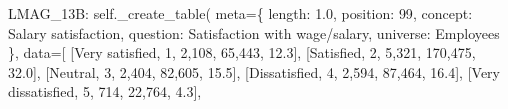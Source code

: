\documentclass[
  11pt,
  a4paper,
]{article}
\newenvironment{Shaded}{\begin{snugshade}}{\end{snugshade}}
\newcommand{\NormalTok}[1]{\textcolor[rgb]{0.00,0.23,0.31}{#1}}
\newcommand{\OperatorTok}[1]{\textcolor[rgb]{0.37,0.37,0.37}{#1}}
\newcommand{\StringTok}[1]{\textcolor[rgb]{0.13,0.47,0.30}{#1}}
\newcommand{\VariableTok}[1]{\textcolor[rgb]{0.07,0.07,0.07}{#1}}
\begin{document}
\begin{Shaded}
\begin{Highlighting}[]
    \StringTok{\textquotesingle{}LMAG\_13B\textquotesingle{}}\NormalTok{: }\VariableTok{self}\NormalTok{.\_create\_table(}
\NormalTok{        meta}\OperatorTok{=}\NormalTok{\{}
            \StringTok{\textquotesingle{}length\textquotesingle{}}\NormalTok{: }\StringTok{\textquotesingle{}1.0\textquotesingle{}}\NormalTok{, }\StringTok{\textquotesingle{}position\textquotesingle{}}\NormalTok{: }\StringTok{\textquotesingle{}99\textquotesingle{}}\NormalTok{,}
            \StringTok{\textquotesingle{}concept\textquotesingle{}}\NormalTok{: }\StringTok{\textquotesingle{}Salary satisfaction\textquotesingle{}}\NormalTok{,}
            \StringTok{\textquotesingle{}question\textquotesingle{}}\NormalTok{: }\StringTok{\textquotesingle{}Satisfaction with wage/salary\textquotesingle{}}\NormalTok{,}
            \StringTok{\textquotesingle{}universe\textquotesingle{}}\NormalTok{: }\StringTok{\textquotesingle{}Employees\textquotesingle{}}
\NormalTok{        \},}
\NormalTok{        data}\OperatorTok{=}\NormalTok{[}
\NormalTok{            [}\StringTok{\textquotesingle{}Very satisfied\textquotesingle{}}\NormalTok{, }\StringTok{\textquotesingle{}1\textquotesingle{}}\NormalTok{, }\StringTok{\textquotesingle{}2,108\textquotesingle{}}\NormalTok{, }\StringTok{\textquotesingle{}65,443\textquotesingle{}}\NormalTok{, }\StringTok{\textquotesingle{}12.3\textquotesingle{}}\NormalTok{],}
\NormalTok{            [}\StringTok{\textquotesingle{}Satisfied\textquotesingle{}}\NormalTok{, }\StringTok{\textquotesingle{}2\textquotesingle{}}\NormalTok{, }\StringTok{\textquotesingle{}5,321\textquotesingle{}}\NormalTok{, }\StringTok{\textquotesingle{}170,475\textquotesingle{}}\NormalTok{, }\StringTok{\textquotesingle{}32.0\textquotesingle{}}\NormalTok{],}
\NormalTok{            [}\StringTok{\textquotesingle{}Neutral\textquotesingle{}}\NormalTok{, }\StringTok{\textquotesingle{}3\textquotesingle{}}\NormalTok{, }\StringTok{\textquotesingle{}2,404\textquotesingle{}}\NormalTok{, }\StringTok{\textquotesingle{}82,605\textquotesingle{}}\NormalTok{, }\StringTok{\textquotesingle{}15.5\textquotesingle{}}\NormalTok{],}
\NormalTok{            [}\StringTok{\textquotesingle{}Dissatisfied\textquotesingle{}}\NormalTok{, }\StringTok{\textquotesingle{}4\textquotesingle{}}\NormalTok{, }\StringTok{\textquotesingle{}2,594\textquotesingle{}}\NormalTok{, }\StringTok{\textquotesingle{}87,464\textquotesingle{}}\NormalTok{, }\StringTok{\textquotesingle{}16.4\textquotesingle{}}\NormalTok{],}
\NormalTok{            [}\StringTok{\textquotesingle{}Very dissatisfied\textquotesingle{}}\NormalTok{, }\StringTok{\textquotesingle{}5\textquotesingle{}}\NormalTok{, }\StringTok{\textquotesingle{}714\textquotesingle{}}\NormalTok{, }\StringTok{\textquotesingle{}22,764\textquotesingle{}}\NormalTok{, }\StringTok{\textquotesingle{}4.3\textquotesingle{}}\NormalTok{],}

\end{Highlighting}
\end{Shaded}
\end{document}
